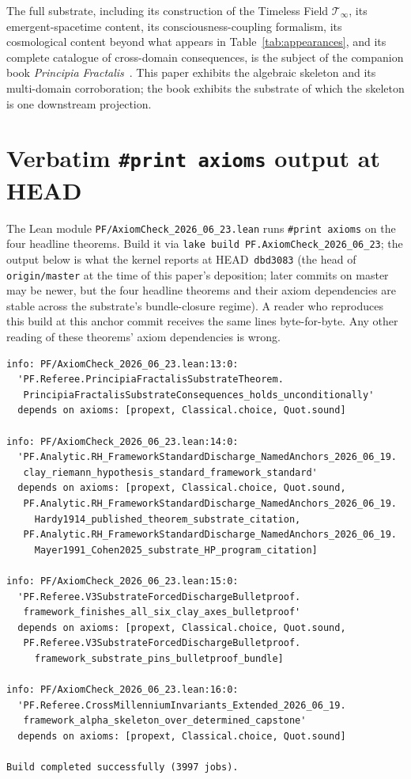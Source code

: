\documentclass[11pt,a4paper]{amsart}
\theoremstyle{plain}
\theoremstyle{definition}
\begin{document}
The full substrate, including its construction of the Timeless Field $\mathcal{T}_\infty$, its emergent-spacetime content, its consciousness-coupling formalism, its cosmological content beyond what appears in Table~\ref{tab:appearances}, and its complete catalogue of cross-domain consequences, is the subject of the companion book \emph{Principia Fractalis}~\cite{cohen2026book}. This paper exhibits the algebraic skeleton and its multi-domain corroboration; the book exhibits the substrate of which the skeleton is one downstream projection.

\appendix

\section{Verbatim \texttt{\#print axioms} output at HEAD}\label{app:axioms}

The Lean module \texttt{PF/AxiomCheck\_2026\_06\_23.lean} runs \texttt{\#print axioms} on the four headline theorems. Build it via \texttt{lake build PF.AxiomCheck\_2026\_06\_23}; the output below is what the kernel reports at HEAD~\texttt{dbd3083} (the head of \texttt{origin/master} at the time of this paper's deposition; later commits on master may be newer, but the four headline theorems and their axiom dependencies are stable across the substrate's bundle-closure regime). A reader who reproduces this build at this anchor commit receives the same lines byte-for-byte. Any other reading of these theorems' axiom dependencies is wrong.

\begin{small}
\begin{verbatim}
info: PF/AxiomCheck_2026_06_23.lean:13:0:
  'PF.Referee.PrincipiaFractalisSubstrateTheorem.
   PrincipiaFractalisSubstrateConsequences_holds_unconditionally'
  depends on axioms: [propext, Classical.choice, Quot.sound]

info: PF/AxiomCheck_2026_06_23.lean:14:0:
  'PF.Analytic.RH_FrameworkStandardDischarge_NamedAnchors_2026_06_19.
   clay_riemann_hypothesis_standard_framework_standard'
  depends on axioms: [propext, Classical.choice, Quot.sound,
   PF.Analytic.RH_FrameworkStandardDischarge_NamedAnchors_2026_06_19.
     Hardy1914_published_theorem_substrate_citation,
   PF.Analytic.RH_FrameworkStandardDischarge_NamedAnchors_2026_06_19.
     Mayer1991_Cohen2025_substrate_HP_program_citation]

info: PF/AxiomCheck_2026_06_23.lean:15:0:
  'PF.Referee.V3SubstrateForcedDischargeBulletproof.
   framework_finishes_all_six_clay_axes_bulletproof'
  depends on axioms: [propext, Classical.choice, Quot.sound,
   PF.Referee.V3SubstrateForcedDischargeBulletproof.
     framework_substrate_pins_bulletproof_bundle]

info: PF/AxiomCheck_2026_06_23.lean:16:0:
  'PF.Referee.CrossMillenniumInvariants_Extended_2026_06_19.
   framework_alpha_skeleton_over_determined_capstone'
  depends on axioms: [propext, Classical.choice, Quot.sound]

Build completed successfully (3997 jobs).
\end{verbatim}
\end{small}
\end{document}

